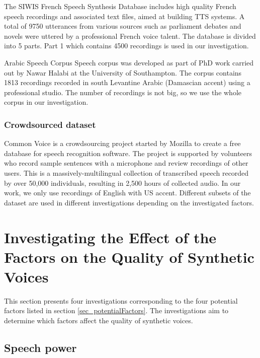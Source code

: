 \documentclass[12pt]{article}
\begin{document}
The SIWIS French Speech Synthesis Database includes high quality French speech recordings and associated text files, aimed at building TTS systems. A total of 9750 utterances from various sources such as parliament debates and novels were uttered by a professional French voice talent. The database is divided into 5 parts. Part 1 which contains 4500 recordings is used in our investigation.

Arabic Speech Corpus Speech corpus was developed as part of PhD work carried out by Nawar Halabi at the University of Southampton. The corpus contains 1813 recordings recorded in south Levantine Arabic (Damascian accent) using a professional studio. The number of recordings is not big, so we use the whole corpus in our investigation.

\subsubsection{Crowdsourced dataset}

Common Voice is a crowdsourcing project started by Mozilla to create a free database for speech recognition software. The project is supported by volunteers who record sample sentences with a microphone and review recordings of other users. This is a massively-multilingual collection of transcribed speech recorded by over 50,000 individuals, resulting in 2,500 hours of collected audio. In our work, we only use recordings of English with US accent. Different subsets of the dataset are used in different investigations depending on the investigated factors.



\clearpage
\section{Investigating the Effect of the Factors on the Quality of Synthetic Voices}\label{sec_investigations}
This section presents four investigations corresponding to the four potential factors listed in section {\ref{sec_potentialFactors}}. The investigations aim to determine which factors affect the quality of synthetic voices.

\subsection{Speech power}
\end{document}
